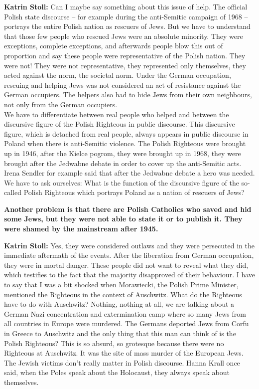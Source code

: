 \textbf{Katrin Stoll:} Can I maybe say something about this issue of help. The official Polish state discourse – for example during the anti-Semitic campaign of 1968 – portrays the entire Polish nation as rescuers of Jews. But we have to understand that those few people who rescued Jews were an absolute minority. They were exceptions, complete exceptions, and afterwards people blow this out of proportion and say these people were representative of the Polish nation. They were not! They were not representative, they represented only themselves, they acted against the norm, the societal norm. Under the German occupation, rescuing and helping Jews was not considered an act of resistance against the German occupiers. The helpers also had to hide Jews from their own neighbours, not only from the German occupiers.\\ 
We have to differentiate between real people who helped and between the discursive figure of the Polish Righteous in public discourse. This discursive figure, which is detached from real people, always appears in public discourse in Poland when there is anti-Semitic violence. The Polish Righteous were brought up in 1946, after the Kielce pogrom, they were brought up in 1968, they were brought after the Jedwabne debate in order to cover up the anti-Semitic acts. Irena Sendler for example said that after the Jedwabne debate a hero was needed. We have to ask ourselves: What is the function of the discursive figure of the so-called Polish Righteous which portrays Poland as a nation of rescuers of Jews? 

\textbf{Another problem is that there are Polish Catholics who saved and hid some Jews, but they were not able to state it or to publish it. They were shamed by the mainstream after 1945.} 

\textbf{Katrin Stoll:} Yes, they were considered outlaws and they were persecuted in the immediate aftermath of the events. After the liberation from German occupation, they were in mortal danger. These people did not want to reveal what they did, which testifies to the fact that the majority disapproved of their behaviour. I have to say that I was a bit shocked when Morawiecki, the Polish Prime Minister, mentioned the Righteous in the context of Auschwitz. What do the Righteous have to do with Auschwitz? Nothing, nothing at all, we are talking about a German Nazi concentration and extermination camp where so many Jews from all countries in Europe were murdered. The Germans deported Jews from Corfu in Greece to Auschwitz and the only thing that this man can think of is the Polish Righteous? This is so absurd, so grotesque because there were no Righteous at Auschwitz. It was the site of mass murder of the European Jews. The Jewish victims don’t really matter in Polish discourse. Hanna Krall once said, when the Poles speak about the Holocaust, they always speak about themselves. 


